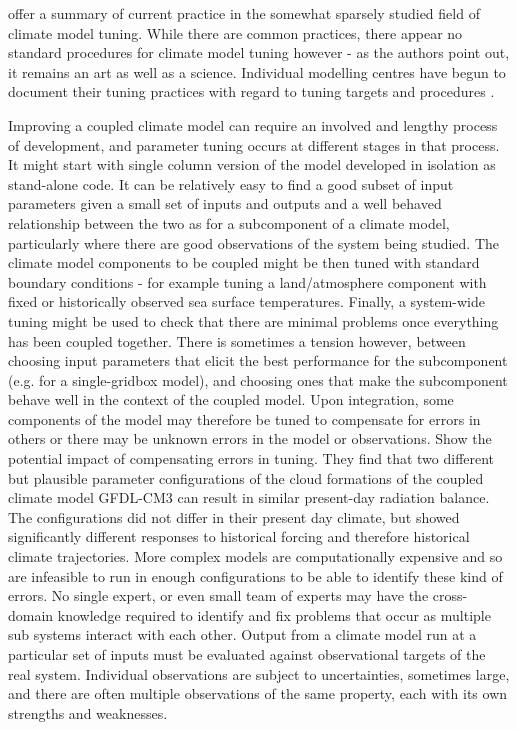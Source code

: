 \documentclass[gmd, manuscript]{copernicus}
\begin{document}
\cite{hourdin2017art} offer a summary of current practice in the somewhat sparsely studied field of climate model tuning. While there are common practices, there appear no standard procedures for climate model tuning however - as the authors point out, it remains an art as well as a science. Individual modelling centres have begun to document their tuning practices with regard to tuning targets and procedures \citep{schmidt2017practice, zhao2018gfdl, walters2017um7}. 

Improving a coupled climate model can require an involved and lengthy process of development, and parameter tuning occurs at different stages in that process. It might start with single column version of the model developed in isolation as stand-alone code. It can be relatively easy to find a good subset of input parameters given a small set of inputs and outputs and a well behaved relationship between the two as for a subcomponent of a climate model, particularly where there are good observations of the system being studied. The climate model components to be coupled might be then tuned with standard boundary conditions - for example tuning a land/atmosphere component with fixed or historically observed sea surface temperatures. Finally, a system-wide tuning might be used to check that there are minimal  problems once everything has been coupled together.  There is sometimes a tension however, between choosing input parameters that elicit the best performance for the subcomponent (e.g. for a single-gridbox model), and choosing ones that make the subcomponent behave well in the context of the coupled model.  Upon integration, some components of the model may therefore be tuned to compensate for errors in others or there may be unknown errors in the model or observations.  \cite{golaz2013cloud} Show the potential impact of compensating errors in tuning. They find that two different but plausible parameter configurations of the cloud formations of the coupled climate model GFDL-CM3 can result in similar present-day radiation balance. The configurations did not differ in their present day climate, but showed significantly different responses to historical forcing and therefore historical climate trajectories. More complex models are computationally expensive and so are infeasible to run in enough configurations to be able to identify these kind of errors. No single expert, or even small team of experts may have the cross-domain knowledge required to identify and fix problems that occur as multiple sub systems interact with each other. Output from a climate model run at a particular set of inputs must be evaluated against observational targets of the real system. Individual observations are subject to uncertainties, sometimes large, and there are often multiple observations of the same property, each with its own strengths and weaknesses.
\end{document}

